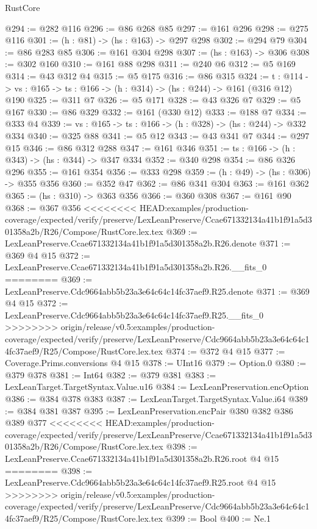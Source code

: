 \begin{lexlean}{RustCore}
\begin{coremodule}
{\begin{coremodule}
@294 := @282 @116
@296 := @86 @268 @85
@297 := @161 @296
@298 := @275 @116
@301 := (h : @81) -> (hs : @163) -> @297 @298
@302 := @294 @79
@304 := @86 @283 @85
@306 := @161 @304 @298
@307 := (hs : @163) -> @306
@308 := @302 @160
@310 := @161 @88 @298
@311 := @240 @6
@312 := @5 @169
@314 := @43 @312 @4
@315 := @5 @175
@316 := @86 @315
@324 := {t : @114} ->
  {vs : @165} -> {ts : @166} -> (h : @314) -> (hs : @244) -> @161 (@316 @12) @190
@325 := @311 @7
@326 := @5 @171
@328 := @43 @326 @7
@329 := @5 @167
@330 := @86 @329
@332 := @161 (@330 @12)
@333 := @188 @7
@334 := @333 @4
@339 := {vs : @165} -> {ts : @166} -> (h : @328) -> (hs : @244) -> @332 @334
@340 := @325 @88
@341 := @5 @12
@343 := @43 @341 @7
@344 := @297 @15
@346 := @86 @312 @288
@347 := @161 @346
@351 := {ts : @166} -> (h : @343) -> (hs : @344) -> @347 @334
@352 := @340 @298
@354 := @86 @326 @296
@355 := @161 @354
@356 := @333 @298
@359 := (h : @49) -> (hs : @306) -> @355 @356
@360 := @352 @47
@362 := @86 @341 @304
@363 := @161 @362
@365 := (hs : @310) -> @363 @356
@366 := @360 @308
@367 := @161 @90
@368 := @367 @356
<<<<<<<< HEAD:examples/production-coverage/expected/verify/preserve/LexLeanPreserve/Ccae671332134a41b1f91a5d301358a2b/R26/Compose/RustCore.lex.tex
@369 := LexLeanPreserve.Ccae671332134a41b1f91a5d301358a2b.R26.denote
@371 := @369 @4 @15
@372 := LexLeanPreserve.Ccae671332134a41b1f91a5d301358a2b.R26.__fits_0
========
@369 := LexLeanPreserve.Cdc9664abb5b23a3e64c64c14fc37aef9.R25.denote
@371 := @369 @4 @15
@372 := LexLeanPreserve.Cdc9664abb5b23a3e64c64c14fc37aef9.R25.__fits_0
>>>>>>>> origin/release/v0.5:examples/production-coverage/expected/verify/preserve/LexLeanPreserve/Cdc9664abb5b23a3e64c64c14fc37aef9/R25/Compose/RustCore.lex.tex
@374 := @372 @4 @15
@377 := Coverage.Prims.conversions @4 @15
@378 := UInt16
@379 := Option.{0}
@380 := @379 @378
@381 := Int64
@382 := @379 @381
@383 := LexLeanTarget.TargetSyntax.Value.u16
@384 := LexLeanPreservation.encOption
@386 := @384 @378 @383
@387 := LexLeanTarget.TargetSyntax.Value.i64
@389 := @384 @381 @387
@395 := LexLeanPreservation.encPair @380 @382 @386 @389 @377
<<<<<<<< HEAD:examples/production-coverage/expected/verify/preserve/LexLeanPreserve/Ccae671332134a41b1f91a5d301358a2b/R26/Compose/RustCore.lex.tex
@398 := LexLeanPreserve.Ccae671332134a41b1f91a5d301358a2b.R26.root @4 @15
========
@398 := LexLeanPreserve.Cdc9664abb5b23a3e64c64c14fc37aef9.R25.root @4 @15
>>>>>>>> origin/release/v0.5:examples/production-coverage/expected/verify/preserve/LexLeanPreserve/Cdc9664abb5b23a3e64c64c14fc37aef9/R25/Compose/RustCore.lex.tex
@399 := Bool
@400 := Ne.{1}

\end{coremodule}}
\end{coremodule}
\end{lexlean}
